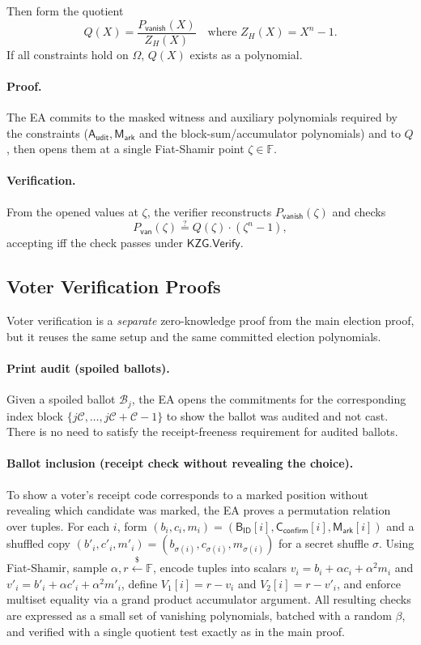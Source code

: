 Then form the quotient
\[
Q(X)=\frac{P_{\mathsf{vanish}}(X)}{Z_H(X)} \quad \text{where } Z_H(X)=X^n-1.
\]
If all constraints hold on $\Omega$, $Q(X)$ exists as a polynomial.  

\paragraph{Proof.}
The EA commits to the masked witness and auxiliary polynomials required by the constraints
($\mathsf{A_{udit}},\mathsf{M_{ark}}$ and the block-sum/accumulator polynomials) and to $Q$,
then opens them at a single Fiat-Shamir point $\zeta\in\mathbb{F}$.  

\paragraph{Verification.}
From the opened values at $\zeta$, the verifier reconstructs $P_{\mathsf{vanish}}(\zeta)$ and checks
\begin{equation*}
P_{\mathsf{van}}(\zeta) \stackrel{?}{=} Q(\zeta)\cdot(\zeta^n-1),
\end{equation*}
accepting iff the check passes under $\mathsf{KZG.Verify}$.  

\subsection{Voter Verification Proofs}
Voter verification is a \emph{separate} zero-knowledge proof from the main election proof, but it reuses the same setup and the same committed election polynomials.  

\paragraph{Print audit (spoiled ballots).}
Given a spoiled ballot $\mathcal{B}_j$, the EA opens the commitments for the corresponding index block $\{j\mathcal{C},\dots,j\mathcal{C}+\mathcal{C}-1\}$ to show the ballot was audited and not cast.
There is no need to satisfy the receipt-freeness requirement for audited ballots.

\paragraph{Ballot inclusion (receipt check without revealing the choice).}
To show a voter’s receipt code corresponds to a marked position without revealing which candidate was marked, the EA proves a permutation relation over tuples.
For each $i$, form $(b_i,c_i,m_i)=(\mathsf{B_{ID}}[i],\mathsf{C}_{\mathsf{confirm}}[i],\mathsf{M_{ark}}[i])$ and a shuffled copy
$(b'_i,c'_i,m'_i)=(b_{\sigma(i)},c_{\sigma(i)},m_{\sigma(i)})$ for a secret shuffle $\sigma$.
Using Fiat-Shamir, sample $\alpha,r\stackrel{\$}{\leftarrow} \mathbb{F}$, encode tuples into scalars
$v_i=b_i+\alpha c_i+\alpha^2 m_i$ and $v'_i=b'_i+\alpha c'_i+\alpha^2 m'_i$, define
$V_1[i]=r-v_i$ and $V_2[i]=r-v'_i$, and enforce multiset equality via a grand product accumulator argument.
All resulting checks are expressed as a small set of vanishing polynomials, batched with
a random $\beta$, and verified with a single quotient test exactly as in the main proof.  

